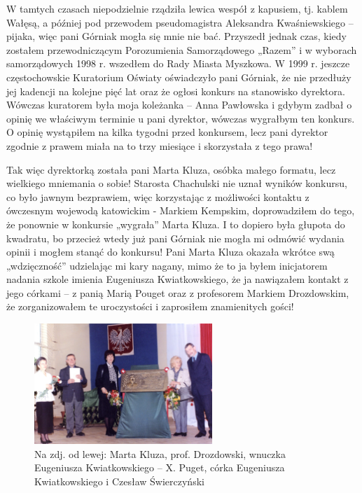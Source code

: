 W tamtych czasach niepodzielnie rządziła lewica wespół z kapusiem, tj. kablem Wałęsą, a później pod przewodem pseudomagistra Aleksandra Kwaśniewskiego – pijaka, więc pani Górniak mogła się mnie nie bać. Przyszedł jednak czas, kiedy zostałem przewodniczącym Porozumienia Samorządowego „Razem” i w wyborach samorządowych 1998 r. wszedłem do Rady Miasta Myszkowa. W 1999 r. jeszcze częstochowskie Kuratorium Oświaty oświadczyło pani Górniak, że nie przedłuży jej kadencji na kolejne pięć lat oraz że ogłosi konkurs na stanowisko dyrektora. Wówczas kuratorem była moja koleżanka – Anna Pawłowska i gdybym zadbał o opinię we właściwym terminie u pani dyrektor, wówczas wygrałbym ten konkurs. O opinię wystąpiłem na kilka tygodni przed konkursem, lecz pani dyrektor zgodnie z prawem miała na to trzy miesiące i skorzystała z tego prawa!

Tak więc dyrektorką została pani Marta Kluza, osóbka małego formatu, lecz wielkiego mniemania o sobie! Starosta Chachulski nie uznał wyników konkursu, co było jawnym bezprawiem, więc korzystając z możliwości kontaktu z ówczesnym wojewodą katowickim - Markiem Kempskim, doprowadziłem do tego, że ponownie w konkursie „wygrała” Marta Kluza. I to dopiero była głupota do kwadratu, bo przecież wtedy już pani Górniak nie mogła mi odmówić wydania opinii i mogłem stanąć do konkursu! Pani Marta Kluza okazała wkrótce swą „wdzięczność” udzielając mi kary nagany, mimo że to ja byłem inicjatorem nadania szkole imienia Eugeniusza Kwiatkowskiego, że ja nawiązałem kontakt z jego córkami – z panią Marią Pouget oraz z profesorem Markiem Drozdowskim, że zorganizowałem te uroczystości i zaprosiłem znamienitych gości!
\begin{figure}[!h]
\begin{center}
\includegraphics[width=0.6\textwidth]{photo/nadanie_imienia_szkole.jpg}
\caption[Nadanie imienia szkole]{Na zdj. od lewej: Marta Kluza, prof. Drozdowski, wnuczka Eugeniusza Kwiatkowskiego -- X. Puget, córka Eugeniusza Kwiatkowskiego i Czesław Świerczyński}
\end{center}
\end{figure}

